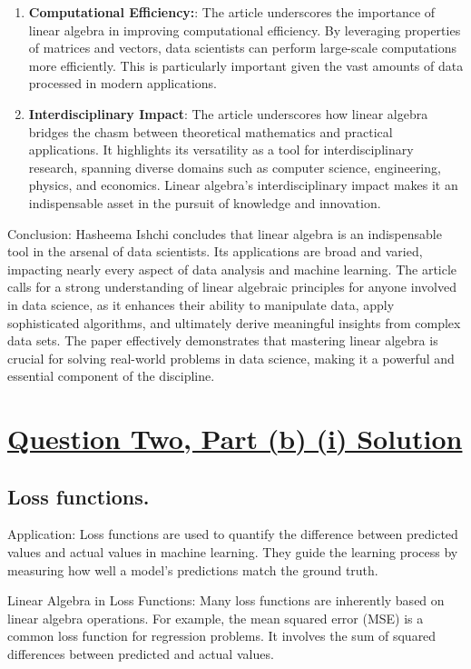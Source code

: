 \documentclass{article}
\begin{document}
\begin{enumerate}
    \item \textbf{Computational Efficiency:}: The article underscores the importance of linear algebra in improving computational efficiency. By leveraging properties of matrices and vectors, data scientists can perform large-scale computations more efficiently. This is particularly important given the vast amounts of data processed in modern applications.

    \item \textbf{Interdisciplinary Impact}: The article underscores how linear algebra bridges the chasm between theoretical mathematics and practical applications. It highlights its versatility as a tool for interdisciplinary research, spanning diverse domains such as computer science, engineering, physics, and economics. Linear algebra's interdisciplinary impact makes it an indispensable asset in the pursuit of knowledge and innovation.

\end{enumerate}

Conclusion:
Hasheema Ishchi concludes that linear algebra is an indispensable tool in the arsenal of data scientists. Its applications are broad and varied, impacting nearly every aspect of data analysis and machine learning. The article calls for a strong understanding of linear algebraic principles for anyone involved in data science, as it enhances their ability to manipulate data, apply sophisticated algorithms, and ultimately derive meaningful insights from complex data sets.
The paper effectively demonstrates that mastering linear algebra is crucial for solving real-world problems in data science, making it a powerful and essential component of the discipline.


\section*{\uline{\large Question Two, Part (b) (i) Solution}}

\subsection*{Loss functions.}
Application: Loss functions are used to quantify the difference between predicted values and actual values in machine learning. They guide the learning process by measuring how well a model's predictions match the ground truth.

Linear Algebra in Loss Functions: Many loss functions are inherently based on linear algebra operations. For example, the mean squared error (MSE) is a common loss function for regression problems. It involves the sum of squared differences between predicted and actual values.
\end{document}
